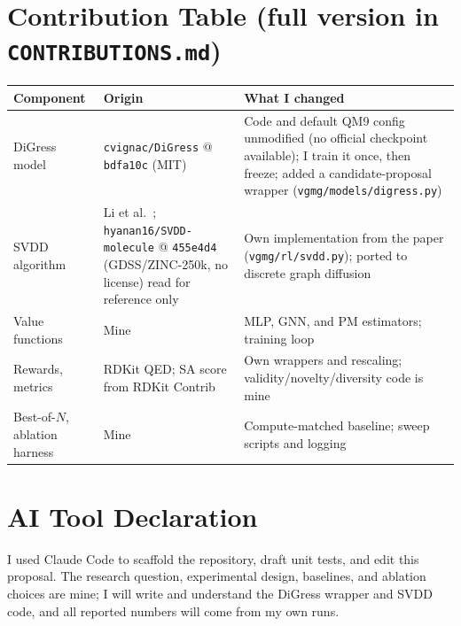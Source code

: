 \documentclass[10pt]{article}
\begin{document}
\normalsize\section{Contribution Table (full version in \texttt{CONTRIBUTIONS.md})}
\small
\begin{tabular}{@{}>{\raggedright\arraybackslash}p{1.15in}>{\raggedright\arraybackslash}p{2.75in}>{\raggedright\arraybackslash}p{3.0in}@{}}
\toprule
Component & Origin & What I changed\\\midrule
DiGress model & \texttt{cvignac/DiGress} @ \texttt{bdfa10c} (MIT) & Code and default QM9 config unmodified (no official checkpoint available); I train it once, then freeze; added a candidate-proposal wrapper (\texttt{vgmg/models/digress.py})\\
SVDD algorithm & Li et al.~\cite{li2024svdd}; \texttt{hyanan16/SVDD-molecule} @ \texttt{455e4d4} (GDSS/ZINC-250k, no license) read for reference only & Own implementation from the paper (\texttt{vgmg/rl/svdd.py}); ported to discrete graph diffusion\\
Value functions & Mine & MLP, GNN, and PM estimators; training loop\\
Rewards, metrics & RDKit QED; SA score from RDKit Contrib & Own wrappers and rescaling; validity/novelty/diversity code is mine\\
Best-of-$N$, ablation harness & Mine & Compute-matched baseline; sweep scripts and logging\\
\bottomrule
\end{tabular}
\normalsize

\section{AI Tool Declaration}
I used Claude Code to scaffold the repository, draft unit tests, and edit this proposal. The research question, experimental design, baselines, and ablation choices are mine; I will write and understand the DiGress wrapper and SVDD code, and all reported numbers will come from my own runs.

{\small

}
\end{document}
